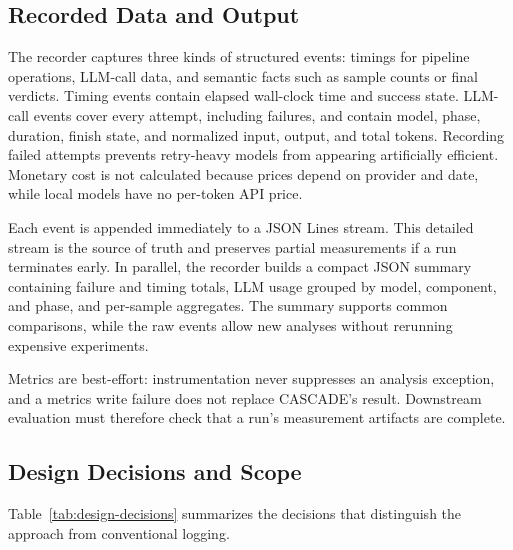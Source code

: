 \subsection{Recorded Data and Output}
\label{sec:solution-event-model}

The recorder captures three kinds of structured events: timings for pipeline
operations, LLM-call data, and semantic facts such as sample counts or final
verdicts. Timing events contain elapsed wall-clock time and success state.
LLM-call events cover every attempt, including failures, and contain model,
phase, duration, finish state, and normalized input, output, and total tokens.
Recording failed attempts prevents retry-heavy models from appearing
artificially efficient. Monetary cost is not calculated because prices depend
on provider and date, while local models have no per-token API price.

Each event is appended immediately to a JSON Lines stream. This detailed stream
is the source of truth and preserves partial measurements if a run terminates
early. In parallel, the recorder builds a compact JSON summary containing
failure and timing totals, LLM usage grouped by model, component, and phase, and
per-sample aggregates. The summary supports common comparisons, while the raw
events allow new analyses without rerunning expensive experiments.

Metrics are best-effort: instrumentation never suppresses an analysis exception,
and a metrics write failure does not replace CASCADE's result. Downstream
evaluation must therefore check that a run's measurement artifacts are complete.

\subsection{Design Decisions and Scope}
\label{sec:solution-decisions}

Table~\ref{tab:design-decisions} summarizes the decisions that distinguish the
approach from conventional logging.

